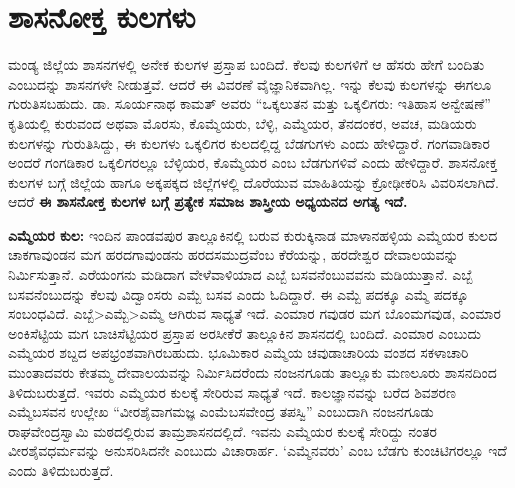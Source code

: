 \section{ಶಾಸನೋಕ್ತ ಕುಲಗಳು}

ಮಂಡ್ಯ ಜಿಲ್ಲೆಯ ಶಾಸನಗಳಲ್ಲಿ ಅನೇಕ ಕುಲಗಳ ಪ್ರಸ್ತಾಪ ಬಂದಿದೆ. ಕೆಲವು ಕುಲಗಳಿಗೆ ಆ ಹೆಸರು ಹೇಗೆ ಬಂದಿತು ಎಂಬುದನ್ನು ಶಾಸನಗಳೇ ನೀಡುತ್ತವೆ. ಆದರೆ ಈ ವಿವರಣೆ ವೈಜ್ಞಾನಿಕವಾಗಿಲ್ಲ. ಇನ್ನು ಕೆಲವು ಕುಲಗಳನ್ನು ಈಗಲೂ ಗುರುತಿಸಬಹುದು. ಡಾ. ಸೂರ್ಯನಾಥ ಕಾಮತ್​ ಅವರು “ಒಕ್ಕಲುತನ ಮತ್ತು ಒಕ್ಕಲಿಗರು: ಇತಿಹಾಸ ಅನ್ವೇಷಣೆ” ಕೃತಿಯಲ್ಲಿ ಕುರುವಂದ ಅಥವಾ ಮೊರಸು, ಕೊಮ್ಮೆಯರು, ಬೆಳ್ಳಿ, ಎಮ್ಮೆಯರ, ತೆನದಂಕರ, ಅವಚ, ಮಡಿಯರು ಕುಲಗಳನ್ನು ಗುರುತಿಸಿದ್ದು, ಈ ಕುಲಗಳು ಒಕ್ಕಲಿಗರ ಕುಲದಲ್ಲಿದ್ದ ಬೆಡಗುಗಳು ಎಂದು ಹೇಳಿದ್ದಾರೆ. ಗಂಗವಾಡಿಕಾರ ಅಂದರೆ ಗಂಗಡಿಕಾರ ಒಕ್ಕಲಿಗರಲ್ಲೂ ಬೆಳ್ಳಿಯರ, ಕೊಮ್ಮೆಯರ ಎಂಬ ಬೆಡಗುಗಳಿವೆ ಎಂದು ಹೇಳಿದ್ದಾರೆ. ಶಾಸನೋಕ್ತ ಕುಲಗಳ ಬಗ್ಗೆ ಜಿಲ್ಲೆಯ ಹಾಗೂ ಅಕ್ಕಪಕ್ಕದ ಜಿಲ್ಲೆಗಳಲ್ಲಿ ದೊರೆಯುವ ಮಾಹಿತಿಯನ್ನು ಕ್ರೋಢೀಕರಿಸಿ ವಿವರಿಸಲಾಗಿದೆ. ಆದರೆ \textbf{ಈ ಶಾಸನೋಕ್ತ ಕುಲಗಳ ಬಗ್ಗೆ ಪ್ರತ್ಯೇಕ ಸಮಾಜ\general{\break } ಶಾಸ್ತ್ರೀಯ ಅಧ್ಯಯನದ ಅಗತ್ಯ ಇದೆ.}

\textbf{ಎಮ್ಮೆಯರ ಕುಲ:} ಇಂದಿನ ಪಾಂಡವಪುರ ತಾಲ್ಲೂಕಿನಲ್ಲಿ ಬರುವ ಕುರುಕ್ಕಿನಾಡ ಮಾಳಾನಹಳ್ಳಿಯ ಎಮ್ಮೆಯರ ಕುಲದ ಚಾಕಗಾವುಂಡನ ಮಗ ಹರದಗಾವುಂಡನು ಹರದಸಮುದ್ರವೆಂಬ ಕೆರೆಯನ್ನು, ಹರದೇಶ್ವರ ದೇವಾಲಯವನ್ನು ನಿರ್ಮಿಸುತ್ತಾನೆ. ಎರೆಯಂಗನು ಮಡಿದಾಗ ವೇಳೆವಾಳಿ\-ಯಾದ ಎಬ್ಬೆ ಬಸವನೆಂಬುವವನು ಮಡಿಯುತ್ತಾನೆ. ಎಬ್ಬೆ ಬಸವನೆಂಬುದನ್ನು ಕೆಲವು ವಿದ್ವಾಂಸರು ಎಮ್ಬೆ ಬಸವ ಎಂದು ಓದಿದ್ದಾರೆ. ಈ ಎಮ್ಬೆ ಪದಕ್ಕೂ ಎಮ್ಮೆ ಪದಕ್ಕೂ ಸಂಬಂಧವಿದೆ. ಎಬ್ಬೆ\textgreater ಎಮ್ಬೆ\textgreater ಎಮ್ಮೆ ಆಗಿರುವ ಸಾಧ್ಯತೆ ಇದೆ. ಎಂಮಾರ ಗವುಡರ ಮಗ ಬೊಂಮಗವುಡ, ಎಂಮಾರ ಅಂಕಿಸೆಟ್ಟಿಯ ಮಗ ಬಾಚಿಸೆಟ್ಟಿಯರ ಪ್ರಸ್ತಾಪ ಅರಸೀಕೆರೆ ತಾಲ್ಲೂಕಿನ ಶಾಸನದಲ್ಲಿ ಬಂದಿದೆ. ಎಂಮಾರ ಎಂಬುದು ಎಮ್ಮೆಯರ ಶಬ್ದದ ಅಪಭ್ರಂಶವಾಗಿರಬಹುದು. ಭೂಮಿಕಾರ ಎಮ್ಮೆಯ ಚವುಡಾಚಾರಿಯ ವಂಶದ ಸಕಳಾಚಾರಿ ಮುಂತಾದವರು ಕೇತಮ್ಮ ದೇವಾಲಯವನ್ನು ನಿರ್ಮಿಸಿದರೆಂದು ನಂಜನಗೂಡು ತಾಲ್ಲೂಕು ಮಣಲೂರು ಶಾಸನದಿಂದ ತಿಳಿದುಬರುತ್ತದೆ. ಇವರು ಎಮ್ಮೆಯರ ಕುಲಕ್ಕೆ ಸೇರಿರುವ ಸಾಧ್ಯತೆ ಇದೆ. ಕಾಲಜ್ಞಾನವನ್ನು ಬರೆದ ಶಿವಶರಣ ಎಮ್ಮೆಬಸವನ ಉಲ್ಲೇಖ “ವೀರಶೈವಾಗಮಜ್ಞ ಎಂಮೆಬಸವೇಂದ್ರ ತಪಸ್ವಿ” ಎಂಬುದಾಗಿ ನಂಜನಗೂಡು ರಾಘವೇಂದ್ರಸ್ವಾಮಿ ಮಠದಲ್ಲಿರುವ ತಾಮ್ರಶಾಸನದಲ್ಲಿದೆ. ಇವನು ಎಮ್ಮೆಯರ ಕುಲಕ್ಕೆ ಸೇರಿದ್ದು ನಂತರ ವೀರಶೈವಧರ್ಮವನ್ನು ಅನುಸರಿಸಿದನೇ ಎಂಬುದು ವಿಚಾರಾರ್ಹ. ‘ಎಮ್ಮೆನವರು’ ಎಂಬ ಬೆಡಗು ಕುಂಚಿಟಿಗರಲ್ಲೂ ಇದೆ ಎಂದು ತಿಳಿದುಬರುತ್ತದೆ.


